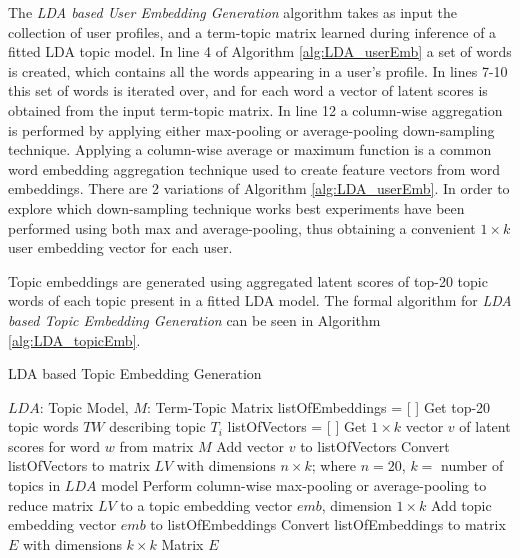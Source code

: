            The \emph{LDA based User Embedding Generation} algorithm takes as input the collection of user profiles, and a term-topic matrix learned during inference of a fitted LDA topic model. In line 4 of Algorithm \ref{alg:LDA_userEmb} a set of words is created, which contains all the words appearing in a user's profile. In lines 7-10 this set of words is iterated over, and for each word a vector of latent scores is obtained from the input term-topic matrix. In line 12 a column-wise aggregation is performed by applying either max-pooling or average-pooling down-sampling technique. Applying a column-wise average or maximum function is a common word embedding aggregation technique \cite{de2016representation} used to create feature vectors from word embeddings. There are 2 variations of Algorithm \ref{alg:LDA_userEmb}. In order to explore which down-sampling technique works best experiments have been performed using both max and average-pooling, thus obtaining a convenient $1 \times k$ user embedding vector for each user.
                    
            Topic embeddings are generated using aggregated latent scores of top-20 topic words of each topic present in a fitted LDA model. The formal algorithm for \emph{LDA based Topic Embedding Generation} can be seen in Algorithm \ref{alg:LDA_topicEmb}. 
        
            \begin{algorithm}
                \caption{LDA based Topic Embedding Generation}
                \label{alg:LDA_topicEmb}
                \begin{algorithmic}[1]
                    \REQUIRE $LDA$: Topic Model, $M$: Term-Topic Matrix
                    \STATE listOfEmbeddings = [ ]
                        \STATE Get top-20 topic words $TW$ describing topic $T_i$
                        \STATE listOfVectors = [ ]
                        \STATE
                            \STATE Get $1 \times k$ vector $v$ of latent scores for word $w$ from matrix $M$
                            \STATE Add vector $v$ to listOfVectors
                        \ENDFOR
                        \STATE Convert listOfVectors to matrix $LV$ with dimensions $n \times k$; where $n=20$, $k=$ number of topics in $LDA$ model
                        \STATE Perform column-wise max-pooling or average-pooling to reduce matrix $LV$ to a topic embedding vector $emb$, dimension $1 \times k$
                        \STATE Add topic embedding vector $emb$ to listOfEmbeddings
                    \ENDFOR
                    \STATE Convert listOfEmbeddings to matrix $E$ with dimensions $k \times k$
                    \RETURN Matrix $E$
                \end{algorithmic}
            \end{algorithm}
            
